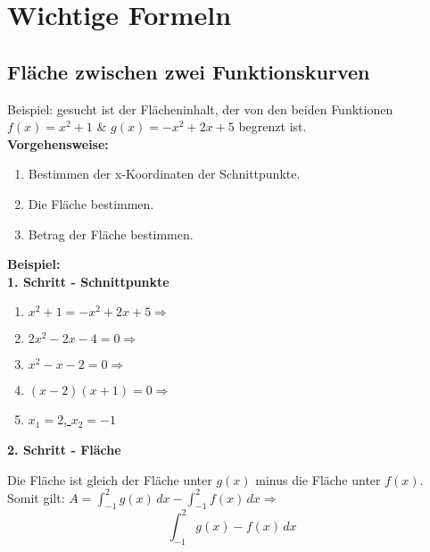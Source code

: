 \documentclass[12pt]{scrartcl}
\begin{document}
\newpage
\section{Wichtige Formeln}
\subsection{Fläche zwischen zwei Funktionskurven}
Beispiel: gesucht ist der Flächeninhalt, der von den beiden Funktionen $f(x) = x^2 + 1$ \& $g(x) = -x^2 + 2x + 5$
begrenzt ist.\\


\textbf{Vorgehensweise:}
\begin{enumerate}
    \item Bestimmen der x-Koordinaten der Schnittpunkte.
    \item Die Fläche bestimmen.
    \item Betrag der Fläche bestimmen.
\end{enumerate}

\hfill \break

\textbf{Beispiel:}\\
\textbf{1. Schritt - Schnittpunkte}
\begin{enumerate}
    \item $x^2 + 1 = -x^2 + 2x + 5 \Rightarrow$
    \item $2x^2 -2x -4 = 0 \Rightarrow $
    \item $x^2 - x - 2 = 0 \Rightarrow$
    \item $(x-2)(x+1) = 0 \Rightarrow$
    \item \underline{$x_1 = 2$, $x_2 = -1$}
\end{enumerate}

\hfill \break
\textbf{2. Schritt - Fläche}

Die Fläche ist gleich der Fläche unter $g(x)$ minus die Fläche unter $f(x)$.\\
Somit gilt:
$A = \int_{-1}^{2} g(x)\, dx - \int_{-1}^{2} f(x)\, dx \Rightarrow$
\[ \int_{-1}^{2} g(x) - f(x)\, dx \]




% 
\end{document}
